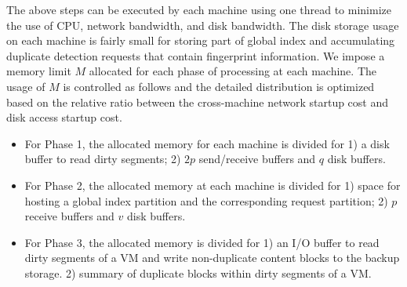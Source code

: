 

The above steps can be executed by each machine
using one thread to minimize the use of CPU, network bandwidth, and disk bandwidth.
The  disk storage usage on each machine 
is fairly small for  storing part of global index and
accumulating  duplicate detection requests that contain fingerprint information.   
We impose a memory limit $M$ allocated for each phase of processing at each machine.
The usage of $M$ is controlled as follows and the detailed distribution is optimized based on the relative
ratio between the cross-machine network  startup cost and disk access startup cost.
\begin{itemize}
\item For Phase 1, the allocated memory for each machine is divided for 
1) a disk buffer to read dirty segments; 2) $2p$ send/receive buffers and $q$ disk buffers.

\item 
For Phase 2,  the allocated memory at each machine is divided for 1) space for hosting a global index partition and 
the corresponding request partition; 2) $p$ receive buffers and $v$ disk buffers.

\item For Phase 3, the allocated memory is divided for 1) an I/O buffer to read dirty segments of a VM and   
write non-duplicate content blocks to the  backup storage.
2) summary of duplicate blocks within dirty segments of  a VM.
\end{itemize}

